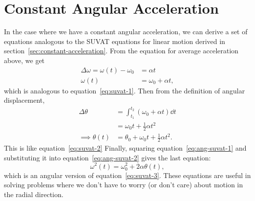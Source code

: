 \documentclass[../classical_mechanics.tex]{subfiles}
\begin{document}
    \section{Constant Angular Acceleration}\label{sec:constant-angular-acceleration}
        In the case where we have a constant angular acceleration, we can derive a set of equations analogous to the SUVAT equations for linear motion derived in section~\ref{sec:constant-acceleration}.
        From the equation for average acceleration above, we get
        \begin{align}
            \Delta\omega=\omega(t)-\omega_0&=\alpha t\\
            \omega(t)&=\omega_0+\alpha t,\label{eq:ang-suvat-1}
        \end{align}
        which is analogous to equation~\ref{eq:suvat-1}.
        Then from the definition of angular displacement,
        \begin{align}
            \Delta\theta&=\int_{t_1}^{t_2}(\omega_0+\alpha t)\dd{t}\\
            &=\omega_0t+\frac{1}{2}\alpha t^2\\
            \implies\theta(t)&=\theta_0+\omega_0t+\frac{1}{2}\alpha t^2.\label{eq:ang-suvat-2}
        \end{align}
        This is like equation~\ref{eq:suvat-2}
        Finally, squaring equation~\ref{eq:ang-suvat-1} and substituting it into equation~\ref{eq:ang-suvat-2} gives the last equation:
        \begin{equation}
            \omega^2(t)=\omega_0^2+2\alpha\theta(t),\label{eq:ang-suvat-3}
        \end{equation}
        which is an angular version of equation~\ref{eq:suvat-3}.
        These equations are useful in solving problems where we don't have to worry (or don't care) about motion in the radial direction.
\end{document}
